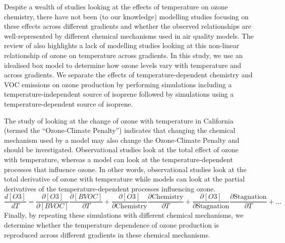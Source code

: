 Despite a wealth of studies looking at the effects of temperature on ozone chemistry, there have not been (to our knowledge) modelling studies focusing on these effects across different  gradients and whether the observed relationships are well-represented by different chemical mechanisms used in air quality models.
The review of \citet{Pusede:2015} also highlights a lack of modelling studies looking at this non-linear relationship of ozone on temperature across  gradients.
In this study, we use an idealised box model to determine how ozone levels vary with temperature and across  gradients.
We separate the effects of temperature-dependent chemistry and VOC emissions on ozone production by performing simulations including a temperature-independent source of isoprene followed by simulations using a temperature-dependent source of isoprene. 

The study of \citet{Rasmussen:2013} looking at the change of ozone with temperature in California (termed the ``Ozone-Climate Penalty'') indicates that changing the chemical mechanism used by a model may also change the Ozone-Climate Penalty and should be investigated.
Observational studies look at the total effect of ozone with temperature, whereas a model can look at the temperature-dependent processes that influence ozone. In other words, observational studies look at the total derivative of ozone with temperature while models can look at the partial derivatives of the temperature-dependent processes influencing ozone. 
\begin{equation*} 
    \frac{d[O3]}{dT} = \frac{\partial [O3]}{\partial [BVOC]}\frac{\partial [BVOC]}{\partial T} + \frac{\partial [O3]}{\partial \text{Chemistry}}\frac{\partial \text{Chemistry}}{\partial T} + \frac{\partial [O3]}{\partial \text{Stagnation}}\frac{\partial \text{Stagnation}}{\partial T} + \dots
\end{equation*}
Finally, by repeating these simulations with different chemical mechanisms, we determine whether the temperature dependence of ozone production is reproduced across different  gradients in these chemical mechanisms.

